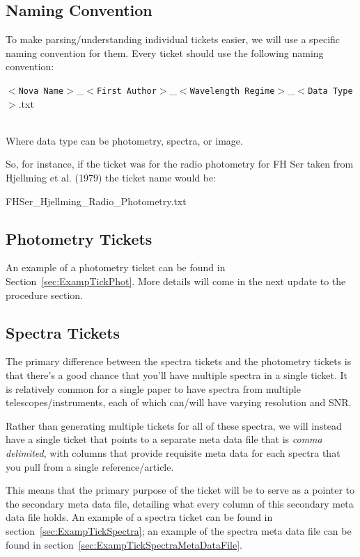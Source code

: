 \documentclass{article}
\begin{document}

\subsection{Naming Convention}
To make parsing/understanding individual tickets easier, we will use a specific naming convention for them. Every ticket should use the following naming convention:\\

\noindent
\begin{Large}
$<$\texttt{Nova Name}$>$\_$<$\texttt{First Author}$>$\_$<$\texttt{Wavelength Regime}$>$\_$<$\texttt{Data Type}$>$.txt
\end{Large}
\\
Where data type can be photometry, spectra, or image.

So, for instance, if the ticket was for the radio photometry for FH Ser taken from Hjellming et al. (1979) the ticket name would be:
\\

\noindent
\begin{Large}
FHSer\_Hjellming\_Radio\_Photometry.txt
\end{Large}


\subsection{Photometry Tickets}
An example of a photometry ticket can be found in Section~\ref{sec:ExampTickPhot}. More details will come in the next update to the procedure section. 


\subsection{Spectra Tickets}
The primary difference between the spectra tickets and the photometry tickets is that there's a good chance that you'll have multiple spectra in a single ticket. It is relatively common for a single paper to have spectra from multiple telescopes/instruments, each of which can/will have varying resolution and SNR.

Rather than generating multiple tickets for all of these spectra, we will instead have a single ticket that points to a separate meta data file that is \emph{comma delimited}, with columns that provide requisite meta data for each spectra that you pull from a single reference/article. 

This means that the primary purpose of the ticket will be to serve as a pointer to the secondary meta data file, detailing what every column of this secondary meta data file holds. An example of a spectra ticket can be found in section~\ref{sec:ExampTickSpectra}; an example of the spectra meta data file can be found in section~\ref{sec:ExampTickSpectraMetaDataFile}. 
\end{document}
